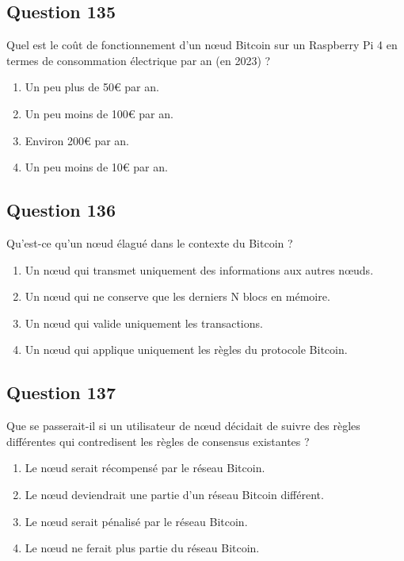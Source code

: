 \documentclass[12pt,a4paper]{article}
\begin{document}
\bigskip


\subsection*{Question 135}
Quel est le coût de fonctionnement d'un nœud Bitcoin sur un Raspberry Pi 4 en termes de consommation électrique par an (en 2023) ?

\begin{enumerate}[label=\Alph*., leftmargin=*]
\item Un peu plus de 50€ par an.
\item Un peu moins de 100€ par an.
\item Environ 200€ par an.
\item Un peu moins de 10€ par an.
\end{enumerate}

\bigskip


\subsection*{Question 136}
Qu'est-ce qu'un nœud élagué dans le contexte du Bitcoin ?

\begin{enumerate}[label=\Alph*., leftmargin=*]
\item Un nœud qui transmet uniquement des informations aux autres nœuds.
\item Un nœud qui ne conserve que les derniers N blocs en mémoire.
\item Un nœud qui valide uniquement les transactions.
\item Un nœud qui applique uniquement les règles du protocole Bitcoin.
\end{enumerate}

\bigskip


\subsection*{Question 137}
Que se passerait-il si un utilisateur de nœud décidait de suivre des règles différentes qui contredisent les règles de consensus existantes ?

\begin{enumerate}[label=\Alph*., leftmargin=*]
\item Le nœud serait récompensé par le réseau Bitcoin.
\item Le nœud deviendrait une partie d'un réseau Bitcoin différent.
\item Le nœud serait pénalisé par le réseau Bitcoin.
\item Le nœud ne ferait plus partie du réseau Bitcoin.
\end{enumerate}
\end{document}
